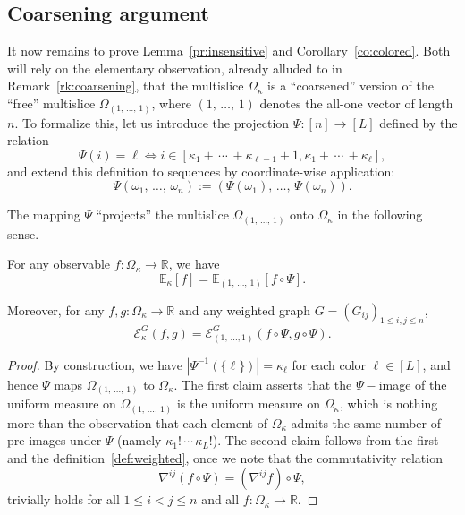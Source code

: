 \documentclass[AHL,Unicode,longabstracts,published]{cedram}
\newcommand{\R}{\mathbb{R}}
\newcommand{\EE}{\mathbb{E}}
\newcommand{\cE}{\mathcal{E}}
\begin{document}
\subsection{Coarsening argument}\label{sec:colored}
It now remains to prove Lemma~\ref{pr:insensitive} and Corollary~\ref{co:colored}. Both will rely on the elementary observation, already alluded to in Remark~\ref{rk:coarsening}, that the multislice $\Omega_\kappa$ is a ``coarsened'' version of the ``free'' multislice $\Omega_{(1,\,\ldots,\,1)}$, where $(1,\,\ldots,\,1)$ denotes the all-one vector of length $n$. To formalize this, let us introduce the projection $\Psi\colon [n]\to[L]$ defined by the relation
\[
\Psi(i) = \ell \Longleftrightarrow i\in\left[\kappa_1+\,\cdots\,+\kappa_{\ell-1}+1,\kappa_1+\,\cdots\,+\kappa_{\ell}\right],
\]
and extend this definition to sequences by coordinate-wise application:
\[
\Psi(\omega_1,\,\ldots,\,\omega_n) := \left(\Psi(\omega_1),\,\ldots,\,\Psi(\omega_n)\right).
\]

The mapping $\Psi$ ``projects'' the multislice $\Omega_{(1,\,\ldots,\,1)}$ onto $\Omega_\kappa$ in the following sense.
\begin{lemm}[Coarsening]\label{lm:coarsening}
For any observable $f\colon\Omega_\kappa\to\R$, we have
\[\label{isomorphic}
\EE_\kappa\left[f\right] = \EE_{(1,\,\ldots,\,1)}\left[f\circ\Psi\right].
\]

Moreover, for any $f,g\colon\Omega_\kappa\to\R$ and any weighted graph $G=(G_{ij})_{1\le i,j\le n}$,
\[\label{coarsening}
\cE_\kappa^G\left(f,g\right) = \cE_{(1,\,\ldots,1)}^G\left(f\circ\Psi,g\circ\Psi\right).
\]
\end{lemm}

\begin{proof}
By construction, we have $|\Psi^{-1}(\{\ell\})|=\kappa_\ell$ for each color $\ell\in[L]$, and hence $\Psi$ maps $\Omega_{(1,\,\ldots,\,1)}$ to $\Omega_\kappa$. The first claim asserts that the $\Psi-$image of the uniform measure on $\Omega_{(1,\,\ldots,\,1)}$ is the uniform measure on $\Omega_\kappa$, which is nothing more than the observation that each element of $\Omega_\kappa$ admits the same number of pre-images under $\Psi$ (namely $\kappa_1!\,\cdots\,\kappa_L!$). The second claim follows from the first and the definition~\eqref{def:weighted}, once we note that the commutativity relation
\[
\nabla^{ij}\left(f\circ\Psi\right) = \left(\nabla^{ij}f\right)\circ\Psi,
\]
trivially holds for all $1\le i<j\le n$ and all $f\colon\Omega_\kappa\to\R$.
\end{proof}
\end{document}
